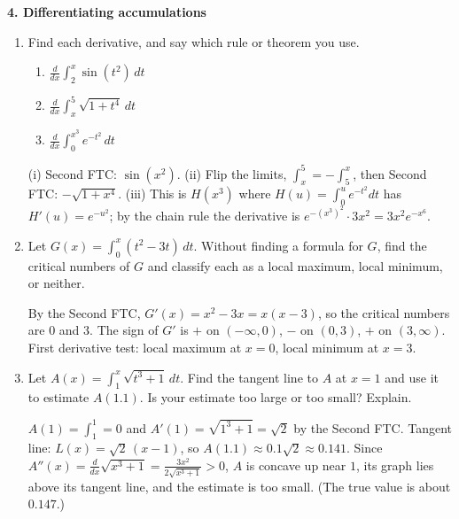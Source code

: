 \documentclass[11pt]{article}
\newcommand{\prob}[2]{\medskip\noindent\textbf{\large #1}\hfill\textit{#2}\par\smallskip}
\begin{document}
\newpage
\prob{4. Differentiating accumulations}{}
\begin{enumerate}
\item {\color{gray!55!black}Find each derivative, and say which rule or theorem you use.
\begin{enumerate}
\item $\displaystyle\frac{d}{dx}\int_2^x\sin(t^2)\,dt$
\item $\displaystyle\frac{d}{dx}\int_x^5\sqrt{1+t^4}\,dt$
\item $\displaystyle\frac{d}{dx}\int_0^{x^3}e^{-t^2}\,dt$
\end{enumerate}}

\smallskip
(i) Second FTC: $\sin(x^2)$. (ii) Flip the limits, $\int_x^5=-\int_5^x$, then Second FTC:
$-\sqrt{1+x^4}$. (iii) This is $H(x^3)$ where $H(u)=\int_0^ue^{-t^2}dt$ has $H'(u)=e^{-u^2}$;
by the chain rule the derivative is $e^{-(x^3)^2}\cdot3x^2=3x^2e^{-x^6}$.
\item {\color{gray!55!black}Let $G(x)=\int_0^x(t^2-3t)\,dt$. Without finding a formula for $G$, find the critical
numbers of $G$ and classify each as a local maximum, local minimum, or neither.}

\smallskip
By the Second FTC, $G'(x)=x^2-3x=x(x-3)$, so the critical numbers are $0$ and $3$. The
sign of $G'$ is $+$ on $(-\infty,0)$, $-$ on $(0,3)$, $+$ on $(3,\infty)$. First derivative
test: local maximum at $x=0$, local minimum at $x=3$.
\item {\color{gray!55!black}Let $A(x)=\int_1^x\sqrt{t^3+1}\,dt$. Find the tangent line to $A$ at $x=1$ and use it to
estimate $A(1.1)$. Is your estimate too large or too small? Explain.}

\smallskip
$A(1)=\int_1^1=0$ and $A'(1)=\sqrt{1^3+1}=\sqrt2$ by the Second FTC. Tangent line:
$L(x)=\sqrt2\,(x-1)$, so $A(1.1)\approx0.1\sqrt2\approx0.141$. Since
$A''(x)=\frac d{dx}\sqrt{x^3+1}=\frac{3x^2}{2\sqrt{x^3+1}}>0$, $A$ is concave up near $1$,
its graph lies above its tangent line, and the estimate is too small. (The true value is
about $0.147$.)
\end{enumerate}
\end{document}
